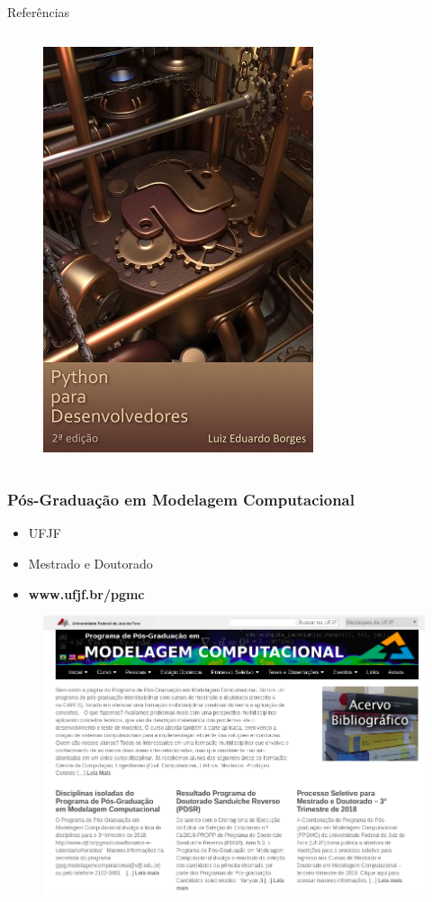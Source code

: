 \documentclass[12pt,t,graphics]{beamer}
\newcommand{\bi}{\begin{itemize}}
\newcommand{\ei}{\end{itemize}}
\begin{document}
\begin{frame}[t]{Referências}
\begin{columns}
\begin{figure}
			\includegraphics[scale=0.25]{img/pypd.jpg}
		\end{figure}
	\end{columns}
\end{frame}


\begin{frame}
  \frametitle{Pós-Graduação em Modelagem Computacional}
  \begin{center}
  \bi
  \item UFJF
  \item Mestrado e Doutorado
  \item \textbf{www.ufjf.br/pgmc}
  \ei
  \begin{figure}
    \centering
    \includegraphics[scale=0.25]{img/pgmc.png}
  \end{figure}
  \end{center}
\end{frame}
\end{document}
